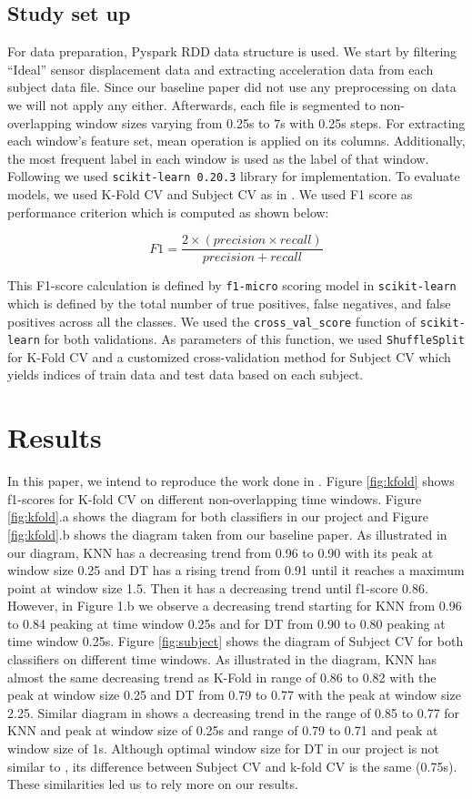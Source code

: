 \documentclass[12pt, a4paper]{article}
\begin{document}
\subsection{Study set up}
For data preparation, Pyspark RDD data structure is used. We start by filtering “Ideal” sensor displacement data and extracting acceleration data from each subject data file. Since our baseline paper did not use any preprocessing on data we will not apply any either. Afterwards, each file is segmented to non-overlapping window sizes varying from 0.25s to 7s with 0.25s steps. For extracting each window’s feature set, mean operation is applied on its columns. Additionally, the most frequent label in each window is used as the label of that window. Following \cite{dehghani}  we used \texttt{scikit-learn 0.20.3} library for implementation. To evaluate models, we used K-Fold CV and Subject CV as in \cite{dehghani} . We used F1 score as performance criterion which is computed as shown below:

$$F1=\frac{2 \times (precision \times recall) }{precision + recall}$$

This F1-score calculation is defined by \texttt{f1-micro} scoring model in \texttt{scikit-learn} which is defined by the total number of true positives, false negatives, and false positives across all the classes.
We used the \texttt{cross\_val\_score} function of \texttt{scikit-learn} for both validations. As parameters of this function, we used \texttt{ShuffleSplit} for K-Fold CV and a customized cross-validation method for Subject CV which yields indices of train data and test data based on each subject.

\section{Results}
In this paper, we intend to reproduce the work done in \cite{dehghani} . Figure \ref{fig:kfold} shows f1-scores for K-fold CV on different non-overlapping time windows. Figure \ref{fig:kfold}.a shows the diagram for both classifiers in our project and Figure \ref{fig:kfold}.b shows the diagram taken from our baseline paper. As illustrated in our diagram, KNN has a decreasing trend from 0.96 to 0.90 with its peak at window size 0.25 and DT has a rising trend from 0.91 until it reaches a maximum point at window size 1.5. Then it has a decreasing trend until f1-score 0.86. However, in Figure 1.b we observe a decreasing trend starting for KNN from 0.96 to 0.84 peaking at time window 0.25s and for DT from 0.90 to 0.80 peaking at time window 0.25s.
Figure \ref{fig:subject} shows the diagram of Subject CV for both classifiers on different time windows. As illustrated in the diagram, KNN has almost the same decreasing trend as K-Fold in range of  0.86 to 0.82 with the peak at window size 0.25 and DT from 0.79 to 0.77 with the peak at window size 2.25. Similar diagram in \cite{dehghani}  shows a decreasing trend in the range of 0.85 to 0.77 for KNN and peak at window size of 0.25s and range of 0.79 to 0.71 and peak at window size of 1s. Although optimal window size for DT in our project is not similar to \cite{dehghani}, its difference between Subject CV and k-fold CV is the same (0.75s). These similarities led us to rely more on our results.
\end{document}
